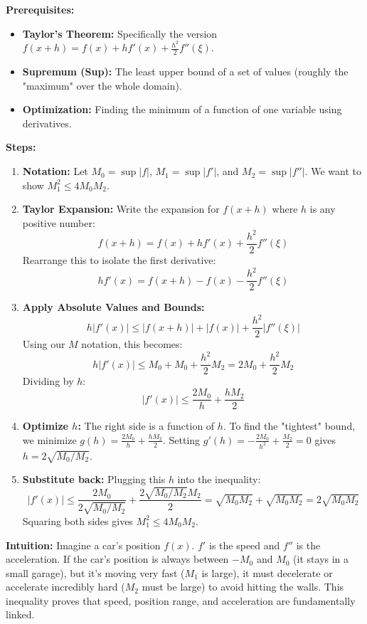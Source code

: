 \begin{solution}
\textbf{Prerequisites:}
\begin{itemize}
    \item \textbf{Taylor's Theorem:} Specifically the version $f(x+h) = f(x) + hf'(x) + \frac{h^2}{2}f''(\xi)$.
    \item \textbf{Supremum (Sup):} The least upper bound of a set of values (roughly the "maximum" over the whole domain).
    \item \textbf{Optimization:} Finding the minimum of a function of one variable using derivatives.
\end{itemize}

\bigskip

\textbf{Steps:}
\begin{enumerate}
    \item \textbf{Notation:} Let $M_0 = \sup|f|$, $M_1 = \sup|f'|$, and $M_2 = \sup|f''|$. We want to show $M_1^2 \leq 4M_0 M_2$.
    
    \item \textbf{Taylor Expansion:} Write the expansion for $f(x+h)$ where $h$ is any positive number:
    \[ f(x+h) = f(x) + hf'(x) + \frac{h^2}{2} f''(\xi) \]
    Rearrange this to isolate the first derivative:
    \[ hf'(x) = f(x+h) - f(x) - \frac{h^2}{2} f''(\xi) \]

    \item \textbf{Apply Absolute Values and Bounds:}
    \[ h|f'(x)| \leq |f(x+h)| + |f(x)| + \frac{h^2}{2} |f''(\xi)| \]
    Using our $M$ notation, this becomes:
    \[ h|f'(x)| \leq M_0 + M_0 + \frac{h^2}{2} M_2 = 2M_0 + \frac{h^2}{2} M_2 \]
    Dividing by $h$:
    \[ |f'(x)| \leq \frac{2M_0}{h} + \frac{h M_2}{2} \]

    \item \textbf{Optimize $h$:} The right side is a function of $h$. To find the "tightest" bound, we minimize $g(h) = \frac{2M_0}{h} + \frac{h M_2}{2}$.
    Setting $g'(h) = -\frac{2M_0}{h^2} + \frac{M_2}{2} = 0$ gives $h = 2\sqrt{M_0/M_2}$.
    
    \item \textbf{Substitute back:} Plugging this $h$ into the inequality:
    \[ |f'(x)| \leq \frac{2M_0}{2\sqrt{M_0/M_2}} + \frac{2\sqrt{M_0/M_2} M_2}{2} = \sqrt{M_0 M_2} + \sqrt{M_0 M_2} = 2\sqrt{M_0 M_2} \]
    Squaring both sides gives $M_1^2 \leq 4 M_0 M_2$.
\end{enumerate}

\bigskip

\textbf{Intuition:} 
Imagine a car's position $f(x)$. $f'$ is the speed and $f''$ is the acceleration. If the car's position is always between $-M_0$ and $M_0$ (it stays in a small garage), but it's moving very fast ($M_1$ is large), it must decelerate or accelerate incredibly hard ($M_2$ must be large) to avoid hitting the walls. This inequality proves that speed, position range, and acceleration are fundamentally linked.
\end{solution}

